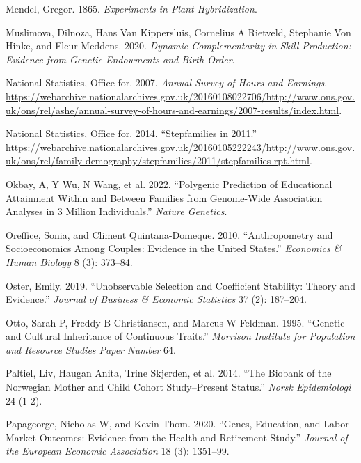 \documentclass[
  12pt,
]{article}
\newlength{\cslhangindent}
\newenvironment{CSLReferences}[2] %
 {\begin{list}{}{%
  \setlength{\itemindent}{0pt}
  \setlength{\leftmargin}{0pt}
  \setlength{\parsep}{0pt}
  \ifodd #1
   \setlength{\leftmargin}{\cslhangindent}
   \setlength{\itemindent}{-1\cslhangindent}
  \fi
  \setlength{\itemsep}{#2\baselineskip}}}
 {\end{list}}
\theoremstyle{definition}
\theoremstyle{definition}
\theoremstyle{definition}
\theoremstyle{definition}
\theoremstyle{remark}
\begin{document}
\begin{CSLReferences}{1}{1}
Mendel, Gregor. 1865. \emph{Experiments in Plant Hybridization}.

Muslimova, Dilnoza, Hans Van Kippersluis, Cornelius A Rietveld, Stephanie Von Hinke, and Fleur Meddens. 2020. \emph{Dynamic Complementarity in Skill Production: Evidence from Genetic Endowments and Birth Order}.

National Statistics, Office for. 2007. \emph{Annual Survey of Hours and Earnings}. \url{https://webarchive.nationalarchives.gov.uk/20160108022706/http://www.ons.gov.uk/ons/rel/ashe/annual-survey-of-hours-and-earnings/2007-results/index.html}.

National Statistics, Office for. 2014. {``Stepfamilies in 2011.''} \url{https://webarchive.nationalarchives.gov.uk/20160105222243/http://www.ons.gov.uk/ons/rel/family-demography/stepfamilies/2011/stepfamilies-rpt.html}.

{Okbay, A, Y Wu, N Wang, et al.} 2022. {``Polygenic Prediction of Educational Attainment Within and Between Families from Genome-Wide Association Analyses in 3 Million Individuals.''} \emph{Nature Genetics}.

Oreffice, Sonia, and Climent Quintana-Domeque. 2010. {``Anthropometry and Socioeconomics Among Couples: Evidence in the United States.''} \emph{Economics \& Human Biology} 8 (3): 373--84.

Oster, Emily. 2019. {``Unobservable Selection and Coefficient Stability: Theory and Evidence.''} \emph{Journal of Business \& Economic Statistics} 37 (2): 187--204.

Otto, Sarah P, Freddy B Christiansen, and Marcus W Feldman. 1995. {``Genetic and Cultural Inheritance of Continuous Traits.''} \emph{Morrison Institute for Population and Resource Studies Paper Number} 64.

Paltiel, Liv, Haugan Anita, Trine Skjerden, et al. 2014. {``The Biobank of the Norwegian Mother and Child Cohort Study--Present Status.''} \emph{Norsk Epidemiologi} 24 (1-2).

Papageorge, Nicholas W, and Kevin Thom. 2020. {``Genes, Education, and Labor Market Outcomes: Evidence from the Health and Retirement Study.''} \emph{Journal of the European Economic Association} 18 (3): 1351--99.


\end{CSLReferences}
\end{document}

